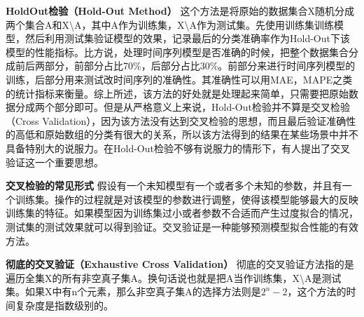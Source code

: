 \documentclass[10pt,a4paper]{ctexbook}
\begin{document}
\textbf{HoldOut检验（Hold-Out Method）}
这个方法是将原始的数据集合X随机分成两个集合A和X\textbackslash{A}，其中A作为训练集，X\textbackslash{A}作为测试集。先使用训练集训练模型，然后利用测试集验证模型的效果，记录最后的分类准确率作为Hold-Out下该模型的性能指标。比方说，处理时间序列模型是否准确的时候，把整个数据集合分成前后两部分，前部分占比70\%，后部分占比30\%。前部分来进行时间序列模型的训练，后部分用来测试改时间序列的准确性。其准确性可以用MAE，MAPE之类的统计指标来衡量。综上所述，该方法的好处就是处理起来简单，只需要把原始数据分成两个部分即可。但是从严格意义上来说，Hold-Out检验并不算是交叉检验（Cross Validation），因为该方法没有达到交叉检验的思想，而且最后验证准确性的高低和原始数组的分类有很大的关系，所以该方法得到的结果在某些场景中并不具备特别大的说服力。在Hold-Out检验不够有说服力的情形下，有人提出了交叉验证这一个重要思想。

\textbf{交叉检验的常见形式}
假设有一个未知模型有一个或者多个未知的参数，并且有一个训练集。操作的过程就是对该模型的参数进行调整，使得该模型能够最大的反映训练集的特征。如果模型因为训练集过小或者参数不合适而产生过度拟合的情况，测试集的测试效果就可以得到验证。交叉验证是一种能够预测模型拟合性能的有效方法。

\textbf{彻底的交叉验证（Exhaustive Cross Validation）}
彻底的交叉验证方法指的是遍历全集X的所有非空真子集A。换句话说也就是把A当作训练集，X\textbackslash{A}是测试集。如果X中有n个元素，那么非空真子集A的选择方法则是$2^{n}-2$，这个方法的时间复杂度是指数级别的。
\end{document}
